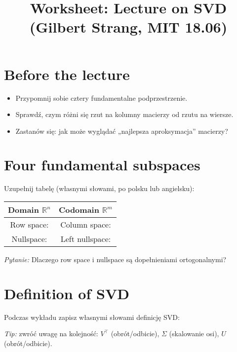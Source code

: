 \documentclass[12pt]{article}
\title{Worksheet: Lecture on SVD (Gilbert Strang, MIT 18.06)}
\author{}
\date{}
\begin{document}
\maketitle

\section*{Before the lecture}
\begin{itemize}
  \item Przypomnij sobie cztery fundamentalne podprzestrzenie.
  \item Sprawdź, czym różni się rzut na kolumny macierzy od rzutu na wiersze.
  \item Zastanów się: jak może wyglądać „najlepsza aproksymacja” macierzy?
\end{itemize}

\section*{Four fundamental subspaces}
Uzupełnij tabelę (własnymi słowami, po polsku lub angielsku):

\bigskip
\begin{tabular}{|c|c|}
\hline
\textbf{Domain $\mathbb{R}^n$} & \textbf{Codomain $\mathbb{R}^m$} \\
\hline
Row space: \hspace{4cm} & Column space: \hspace{4cm} \\
\hline
Nullspace: \hspace{4cm} & Left nullspace: \hspace{4cm} \\
\hline
\end{tabular}

\bigskip
\textit{Pytanie:} Dlaczego row space i nullspace są dopełnieniami ortogonalnymi? 

\section*{Definition of SVD}
Podczas wykładu zapisz własnymi słowami definicję SVD:

\bigskip
{}

\bigskip
\textit{Tip:} zwróć uwagę na kolejność: $V^\top$ (obrót/odbicie), $\Sigma$ (skalowanie osi), $U$ (obrót/odbicie).
\end{document}
